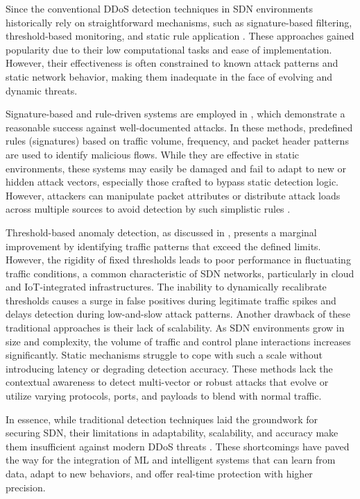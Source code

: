 \documentclass[ASNA,twocolumn]{USG} %
\begin{document}
Since the conventional DDoS detection techniques in SDN environments historically rely on straightforward mechanisms, such as signature-based filtering, threshold-based monitoring, and static rule application \cite{anand2024securing}. These approaches gained popularity due to their low computational tasks and ease of implementation. However, their effectiveness is often constrained to known attack patterns and static network behavior, making them inadequate in the face of evolving and dynamic threats.

Signature-based and rule-driven systems are employed in \cite{bhayo2021time, anand2024securing, fan2021detection}, which demonstrate a reasonable success against well-documented attacks. In these methods, predefined rules (signatures) based on traffic volume, frequency, and packet header patterns are used to identify malicious flows. While they are effective in static environments, these systems may easily be damaged \cite{maleh2023comprehensive} and fail to adapt to new or hidden attack vectors, especially those crafted to bypass static detection logic. However, attackers can manipulate packet attributes or distribute attack loads across multiple sources to avoid detection by such simplistic rules \cite{eliyan2021and}.

Threshold-based anomaly detection, as discussed in \cite{ma2023real}, presents a marginal improvement by identifying traffic patterns that exceed the defined limits. However, the rigidity of fixed thresholds leads to poor performance in fluctuating traffic conditions, a common characteristic of SDN networks, particularly in cloud and IoT-integrated infrastructures. The inability to dynamically recalibrate thresholds causes a surge in false positives during legitimate traffic spikes and delays detection during low-and-slow attack patterns. Another drawback of these traditional approaches is their lack of scalability. As SDN environments grow in size and complexity, the volume of traffic and control plane interactions increases significantly. Static mechanisms struggle to cope with such a scale without introducing latency or degrading detection accuracy. These methods lack the contextual awareness to detect multi-vector or robust attacks that evolve or utilize varying protocols, ports, and payloads to blend with normal traffic.

In essence, while traditional detection techniques laid the groundwork for securing SDN, their limitations in adaptability, scalability, and accuracy make them insufficient against modern DDoS threats \cite{hirsi2025comprehensive}. These shortcomings have paved the way for the integration of ML and intelligent systems that can learn from data, adapt to new behaviors, and offer real-time protection with higher precision.
\end{document}
